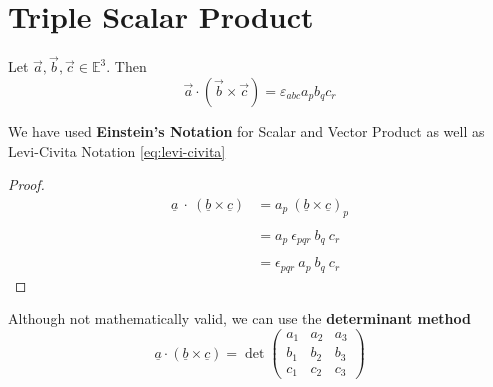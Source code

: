 \section{Triple Scalar Product}

\begin{theorem}
	Let $\vec{a}, \vec{b}, \vec{c} \in \mathbb{E}^{3}$. Then
	\begin{equation}
		\label{eq: triple-scalar-product}
		\vec{a} \cdot (\vec{b} \times \vec{c}) = \varepsilon_{abc}a_pb_qc_r
	\end{equation}
\end{theorem}
\begin{note}
	We have used \textbf{Einstein's Notation} for Scalar and Vector Product as well as Levi-Civita Notation \ref{eq:levi-civita}
\end{note}
\begin{proof}
	\begin{align*} \underline{a} \ \cdot \ (\underline{b} \times \underline{c}) & = a_{p}\ (\underline{b} \times \underline{c})_{p} \\ \\ &= a_{p}\ \epsilon_{pqr}\ b_{q}\ c_{r}\\ \\
                                                                            & = \epsilon_{pqr}\ a_{p}\ b_{q}\ c_{r}\end{align*}
\end{proof}
\begin{note}
	Although not mathematically valid, we can use the {\bf determinant method}
	$$\underline{a} \cdot(\underline{b} \times \underline{c}) =
		\det\begin{pmatrix}a_1 & a_2 & a_3 \\ b_{1} & b_{2} & b_{3} \\ c_{1}  & c_{2} & c_{3}\end{pmatrix}$$
\end{note}
